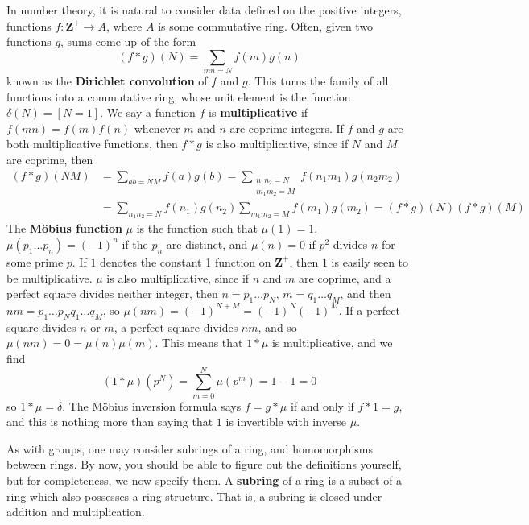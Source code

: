 \begin{example}
    In number theory, it is natural to consider data defined on the positive integers, functions $f: \mathbf{Z}^+ \to A$, where $A$ is some commutative ring. Often, given two functions $g$, sums come up of the form
    \[ (f * g)(N) = \sum_{mn = N} f(m) g(n) \]
    known as the {\bf Dirichlet convolution} of $f$ and $g$. This turns the family of all functions into a commutative ring, whose unit element is the function $\delta(N) = [N = 1]$. We say a function $f$ is {\bf multiplicative} if $f(mn) = f(m)f(n)$ whenever $m$ and $n$ are coprime integers. If $f$ and $g$ are both multiplicative functions, then $f * g$ is also multiplicative, since if $N$ and $M$ are coprime, then
    \begin{align*}
        (f * g)(NM) &= \sum_{ab = NM} f(a) g(b) = \sum_{\substack{n_1n_2 = N\\m_1m_2 = M}} f(n_1m_1) g(n_2m_2)\\
        &= \sum_{n_1n_2 = N} f(n_1)g(n_2) \sum_{m_1m_2 = M} f(m_1) g(m_2) = (f * g)(N) (f * g)(M)
    \end{align*}
    The {\bf M\"{o}bius function} $\mu$ is the function such that $\mu(1) = 1$, $\mu(p_1 \dots p_n) = (-1)^n$ if the $p_n$ are distinct, and $\mu(n) = 0$ if $p^2$ divides $n$ for some prime $p$. If $1$ denotes the constant 1 function on $\mathbf{Z}^+$, then $1$ is easily seen to be multiplicative. $\mu$ is also multiplicative, since if $n$ and $m$ are coprime, and a perfect square divides neither integer, then $n = p_1 \dots p_N$, $m = q_1 \dots q_M$, and then $nm = p_1 \dots p_N q_1 \dots q_M$, so $\mu(nm) = (-1)^{N+M} = (-1)^N (-1)^M$. If a perfect square divides $n$ or $m$, a perfect square divides $nm$, and so $\mu(nm) = 0 = \mu(n)\mu(m)$. This means that $1 * \mu$ is multiplicative, and we find
    \[ (1 * \mu)(p^N) = \sum_{m = 0}^N \mu(p^m) = 1 - 1 = 0 \]
    so $1 * \mu = \delta$. The M\"{o}bius inversion formula says $f = g * \mu$ if and only if $f * 1 = g$, and this is nothing more than saying that $1$ is invertible with inverse $\mu$.
\end{example}

As with groups, one may consider subrings of a ring, and homomorphisms between rings. By now, you should be able to figure out the definitions yourself, but for completeness, we now specify them. A {\bf subring} of a ring is a subset of a ring which also possesses a ring structure. That is, a subring is closed under addition and multiplication.

